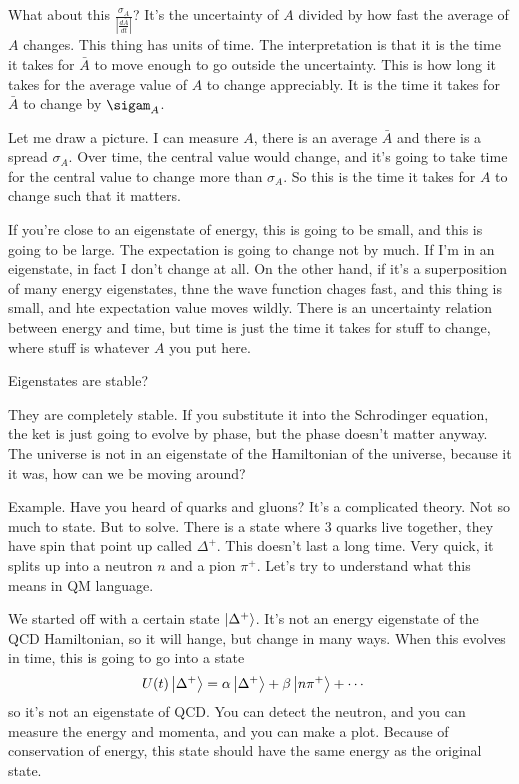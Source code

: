 What about this $\frac{\sigma_A}{\left|\frac{d\bar{A}}{dt}\right|}$?
It's the uncertainty of $A$ divided by how fast the average of $A$ changes.
This thing has units of time.
The interpretation is that it is the time it takes for $\bar{A}$
to move enough to go outside the uncertainty.
This is how long it takes for the average value of $A$ to change appreciably.
It is the time it takes for $\bar{A}$ to change by $\sigam_A$.

Let me draw a picture.
I can measure $A$,
there is an average $\bar{A}$ and there is a spread $\sigma_A$.
Over time,
the central value would change,
and it's going to take time for the central value to change more than
$\sigma_A$.
So this is the time it takes for $A$ to change such that it matters.

If you're close to an eigenstate of energy,
this is going to be small,
and this is going to be large.
The expectation is going to change not by much.
If I'm in an eigenstate,
in fact I don't change at all.
On the other hand,
if it's a superposition of many energy eigenstates,
thne the wave function chages fast,
and this thing is small,
and hte expectation value moves wildly.
There is an uncertainty relation between energy and time,
but time is just the time it takes for stuff to change,
where stuff is whatever $A$ you put here.


\begin{question}
    Eigenstates are stable?
\end{question}
They are completely stable.
If you substitute it into the Schrodinger equation,
the ket is just going to evolve by phase,
but the phase doesn't matter anyway.
The universe is not in an eigenstate of the Hamiltonian of the universe,
because it it was,
how can we be moving around?

Example.
Have you heard of quarks and gluons?
It's a complicated theory.
Not so much to state.
But to solve.
There is a state where 3 quarks live together,
they have spin that point up called $\Delta^+$.
This doesn't last a long time.
Very quick,
it splits up into a neutron $n$ and a pion $\pi^+$.
Let's try to understand what this means in QM language.

We started off with a certain state
$\ket{\Delta^+}$.
It's not an energy eigenstate of the QCD Hamiltonian,
so it will hange,
but change in many ways.
When this evolves in time,
this is going to go into a state
\begin{align}
    U(t)\ket{\Delta^+} &=
    \alpha\ket{\Delta^+} + \beta \ket{n \pi^+} + \cdots
\end{align}
so it's not an eigenstate of QCD.
You can detect the neutron,
and you can measure the energy and momenta,
and you can make a plot.
Because of conservation of energy,
this state should have the same energy as the original state.

